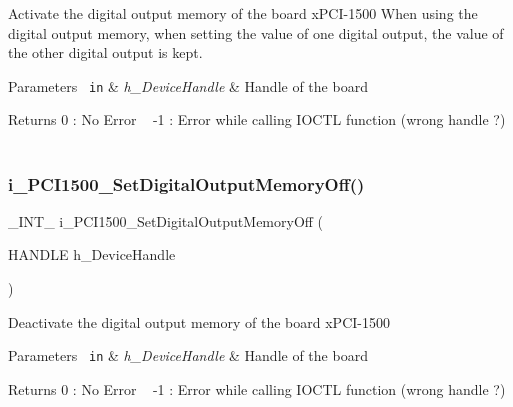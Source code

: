 Activate the digital output memory of the board x\+P\+C\+I-\/1500 When using the digital output memory, when setting the value of one digital output, the value of the other digital output is kept.


\begin{DoxyParams}[1]{Parameters}
\mbox{\texttt{ in}}  & {\em h\+\_\+\+Device\+Handle} & Handle of the board\\
\hline
\end{DoxyParams}
\begin{DoxyReturn}{Returns}
0 \+: No Error ~\newline
 -\/1 \+: Error while calling I\+O\+C\+TL function (wrong handle ?) ~\newline

\end{DoxyReturn}
\mbox{\label{group___dig_out_memory_ga46554567f47286eb28382a0d77cfbc23}} 
\subsubsection{\texorpdfstring{i\_PCI1500\_SetDigitalOutputMemoryOff()}{i\_PCI1500\_SetDigitalOutputMemoryOff()}}
{\footnotesize\ttfamily \+\_\+\+I\+N\+T\+\_\+ i\+\_\+\+P\+C\+I1500\+\_\+\+Set\+Digital\+Output\+Memory\+Off (\begin{DoxyParamCaption}\item[{H\+A\+N\+D\+LE}]{h\+\_\+\+Device\+Handle }\end{DoxyParamCaption})}

Deactivate the digital output memory of the board x\+P\+C\+I-\/1500


\begin{DoxyParams}[1]{Parameters}
\mbox{\texttt{ in}}  & {\em h\+\_\+\+Device\+Handle} & Handle of the board\\
\hline
\end{DoxyParams}
\begin{DoxyReturn}{Returns}
0 \+: No Error ~\newline
 -\/1 \+: Error while calling I\+O\+C\+TL function (wrong handle ?) ~\newline

\end{DoxyReturn}
